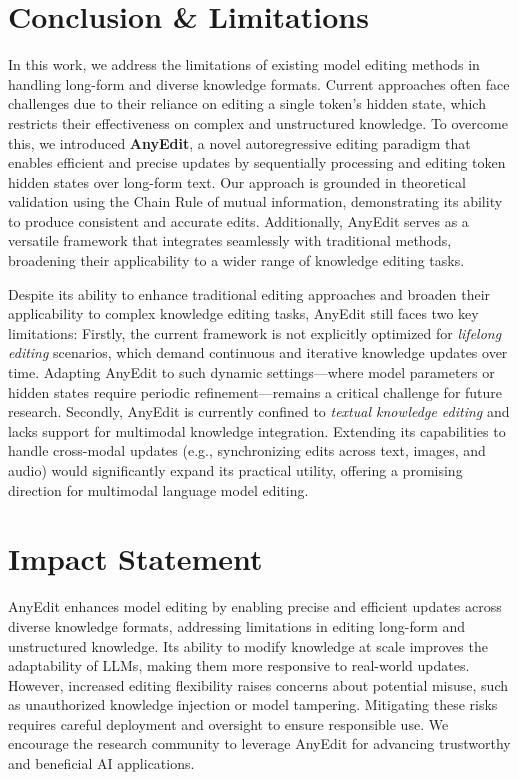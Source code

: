 \section{Conclusion \& Limitations}

In this work, we address the limitations of existing model editing methods in handling long-form and diverse knowledge formats. Current approaches often face challenges due to their reliance on editing a single token’s hidden state, which restricts their effectiveness on complex and unstructured knowledge. To overcome this, we introduced \textbf{AnyEdit}, a novel autoregressive editing paradigm that enables efficient and precise updates by sequentially processing and editing token hidden states over long-form text. Our approach is grounded in theoretical validation using the Chain Rule of mutual information, demonstrating its ability to produce consistent and accurate edits. Additionally, AnyEdit serves as a versatile framework that integrates seamlessly with traditional methods, broadening their applicability to a wider range of knowledge editing tasks. 

Despite its ability to enhance traditional editing approaches and broaden their applicability to complex knowledge editing tasks, AnyEdit still faces two key limitations: Firstly, the current framework is not explicitly optimized for \textit{lifelong editing} scenarios, which demand continuous and iterative knowledge updates over time. Adapting AnyEdit to such dynamic settings—where model parameters or hidden states require periodic refinement—remains a critical challenge for future research. Secondly, AnyEdit is currently confined to \textit{textual knowledge editing} and lacks support for multimodal knowledge integration. Extending its capabilities to handle cross-modal updates (e.g., synchronizing edits across text, images, and audio) would significantly expand its practical utility, offering a promising direction for multimodal language model editing.

\section{Impact Statement}

AnyEdit enhances model editing by enabling precise and efficient updates across diverse knowledge formats, addressing limitations in editing long-form and unstructured knowledge. Its ability to modify knowledge at scale improves the adaptability of LLMs, making them more responsive to real-world updates. However, increased editing flexibility raises concerns about potential misuse, such as unauthorized knowledge injection or model tampering. Mitigating these risks requires careful deployment and oversight to ensure responsible use. We encourage the research community to leverage AnyEdit for advancing trustworthy and beneficial AI applications.

